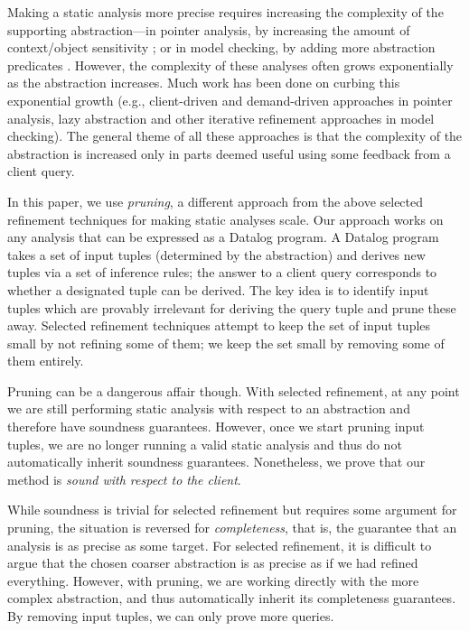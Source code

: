 
Making a static analysis more precise requires increasing the complexity of the
supporting abstraction---in pointer analysis, by increasing the amount of
context/object sensitivity \cite{kcfa, kobj, MilanovaRountevRyder2005,
WhaleyLam2004, LhotakHendren2006, LhotakHendren2008}; or in model checking, by
adding more abstraction predicates \cite{graf97predicate,slam}.
However, the complexity of these analyses often grows exponentially as the
abstraction increases.
Much work has been done on curbing this exponential growth
(e.g., client-driven \cite{GuyerLin2003} and demand-driven
\cite{HeintzeTardieu2001} approaches in pointer analysis,
lazy abstraction \cite{henzinger02lazy,mcmillan06lazy} and other iterative refinement approaches in model checking).
The general theme of all these approaches is that the
complexity of the abstraction is increased only in parts deemed useful using
some feedback from a client query.

In this paper, we use {\em pruning}, a different approach from
the above selected refinement techniques for making static analyses scale.
Our approach works on any analysis that can be expressed as a Datalog program.
A Datalog program takes a set of input tuples (determined by the abstraction)
and derives new tuples via a set of inference rules; the answer to a client
query corresponds to whether a designated tuple can be derived.  The key idea
is to identify input tuples which are provably irrelevant for deriving the
query tuple and prune these away.  Selected refinement techniques
attempt to keep the set of input tuples small by not refining some of them; we
keep the set small by removing some of them entirely.

Pruning can be a dangerous affair though.  With selected refinement, at any
point we are still performing static analysis with respect to an abstraction
and therefore have soundness guarantees.  However, once we start pruning input
tuples, we are no longer running a valid static analysis and thus do not
automatically inherit soundness guarantees.  Nonetheless, we prove that our
method is {\em sound with respect to the client}.

While soundness is trivial for selected refinement but requires some argument for pruning,
the situation is reversed for {\em completeness}, that is, the guarantee that
an analysis is as precise as some target.  For selected refinement,
it is difficult to argue that the chosen coarser abstraction is as precise as if we
had refined everything.  However, with pruning, we are working directly with
the more complex abstraction, and thus automatically inherit its completeness
guarantees.  By removing input tuples, we can only prove more queries.

